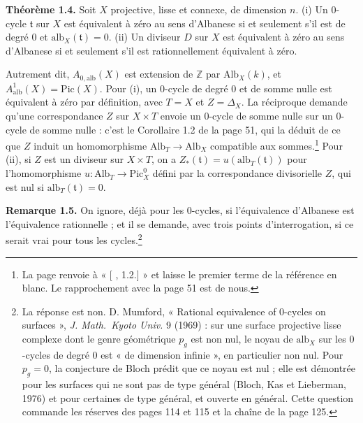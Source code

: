 \documentclass[11pt,a4paper]{article}
\begin{document}
\textbf{Théorème 1.4.} Soit $X$ projective, lisse et connexe, de dimension $n$.
(i) Un $0$-cycle $\mathfrak{t}$ sur $X$ est équivalent à zéro au sens d'Albanese
si et seulement s'il est de degré $0$ et $\mathrm{alb}_{X}(\mathfrak{t}) = 0$.
(ii) Un diviseur $D$ sur $X$ est équivalent à zéro au sens d'Albanese si et
seulement s'il est rationnellement équivalent à zéro.

Autrement dit, $A_{0,\mathrm{alb}}(X)$ est extension de $\mathbb{Z}$ par
$\mathrm{Alb}_{X}(k)$, et $A^{1}_{\mathrm{alb}}(X) = \mathrm{Pic}(X)$. Pour (i),
un $0$-cycle de degré $0$ et de somme nulle est équivalent à zéro par
définition, avec $T = X$ et $Z = \Delta_{X}$. La réciproque demande qu'une
correspondance $Z$ sur $X \times T$ envoie un $0$-cycle de somme nulle sur un
$0$-cycle de somme nulle : c'est le Corollaire 1.2 de la page 51, qui la déduit
de ce que $Z$ induit un homomorphisme $\mathrm{Alb}_{T} \to \mathrm{Alb}_{X}$
compatible aux sommes.\footnote{La page renvoie à « [ , 1.2.] » et laisse le
premier terme de la référence en blanc. Le rapprochement avec la page 51 est de
nous.} Pour (ii), si $Z$ est un diviseur sur $X \times T$, on a
$Z_{*}(\mathfrak{t}) = u(\mathrm{alb}_{T}(\mathfrak{t}))$ pour l'homomorphisme
$u \colon \mathrm{Alb}_{T} \to \mathrm{Pic}^{0}_{X}$ défini par la
correspondance divisorielle $Z$, qui est nul si $\mathrm{alb}_{T}(\mathfrak{t})
= 0$.

\textbf{Remarque 1.5.} On ignore, déjà pour les $0$-cycles, si l'équivalence
d'Albanese est l'équivalence rationnelle ; et il se demande, avec trois points
d'interrogation, si ce serait vrai pour tous les cycles.\footnote{La réponse est
non. D. Mumford, « Rational equivalence of 0-cycles on surfaces »,
\emph{J. Math.\ Kyoto Univ.} 9 (1969) : sur une surface projective lisse
complexe dont le genre géométrique $p_{g}$ est non nul, le noyau de
$\mathrm{alb}_{X}$ sur les $0$-cycles de degré $0$ est « de dimension infinie »,
en particulier non nul. Pour $p_{g} = 0$, la conjecture de Bloch prédit que ce
noyau est nul ; elle est démontrée pour les surfaces qui ne sont pas de type
général (Bloch, Kas et Lieberman, 1976) et pour certaines de type général, et
ouverte en général. Cette question commande les réserves des pages 114 et 115
et la chaîne de la page 125.}
\end{document}
